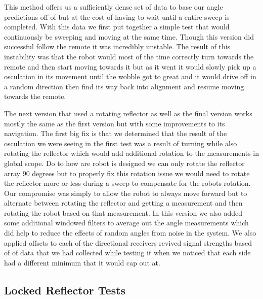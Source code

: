 \vspace*{12pt}
\noindent
This method offers us a sufficiently dense set of data to base our angle predictions off of but at the cost of having to wait until a entire sweep is completed. With this data we first put together a simple test that would continuously be sweeping and moving at the same time. Though this version did successful follow the remote it was incredibly unstable.  The result of this instability was that the robot would most of the time correctly turn towards the remote and then start moving towards it but as it went it would slowly pick up a osculation in its movement until the wobble got to great and it would drive off in a random direction then find its way back into alignment and resume moving towards the remote.

\vspace*{12pt}
\noindent
The next version that used a rotating reflector as well as the final version works mostly the same as the first version but with some improvements to its navigation.  The first big fix is that we determined that the result of the osculation we were seeing in the first test was a result of turning while also rotating the reflector which would add additional rotation to the measurements in global scope.  Do to how are robot is designed we can only rotate the reflector array 90 degrees but to properly fix this rotation issue we would need to rotate the reflector more or less during a sweep to compensate for the robots rotation. Our compromise was simply to allow the robot to always move forward but to alternate between rotating the reflector and getting a measurement and then rotating the robot based on that measurement.  In this version we also added some additional windowed filters to average out the angle measurements which did help to reduce the effects of random angles from noise in the system.  We also applied offsets to each of the directional receivers revived signal strengths based of of data that we had collected while testing it when we noticed that each side had a different minimum that it would cap out at.

\subsection{Locked Reflector Tests}

